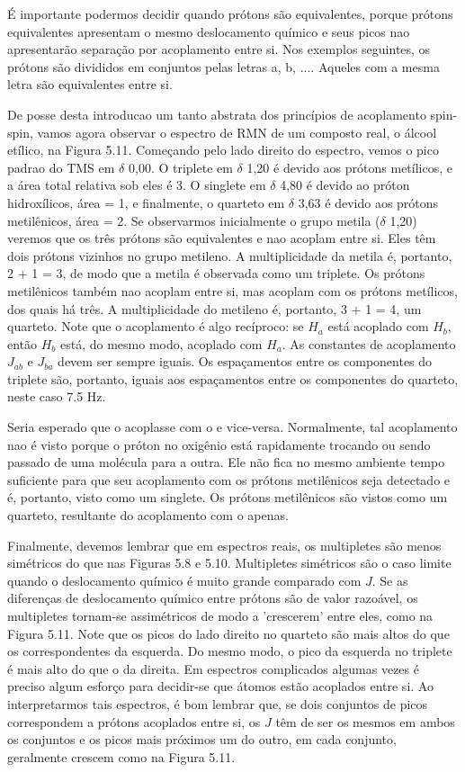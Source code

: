 É importante podermos decidir quando prótons são equivalentes, porque prótons equivalentes apresentam o mesmo deslocamento químico e seus picos nao apresentarão separação por acoplamento entre si. Nos exemplos seguintes, os prótons são divididos em conjuntos pelas letras a, b, .... Aqueles com a mesma letra são equivalentes entre si.

De posse desta introducao um tanto abstrata dos princípios de acoplamento spin-spin, vamos agora observar o espectro de RMN de um composto real, o álcool etílico, na Figura 5.11. Começando pelo lado direito do espectro, vemos o pico padrao do TMS em $\delta$ 0,00. O triplete em $\delta$ 1,20 é devido aos prótons metílicos, e a área total relativa sob eles é 3. O singlete em $\delta$ 4,80 é devido ao próton hidroxílicos, área = 1, e finalmente, o quarteto em $\delta$ 3,63 é devido aos prótons metilênicos, área = 2. Se observarmos inicialmente o grupo metila ($\delta$ 1,20) veremos que os três prótons são equivalentes e nao acoplam entre si. Eles têm dois prótons vizinhos no grupo metileno. A multiplicidade da metila é, portanto, 2 + 1 = 3, de modo que a metila é observada como um triplete. Os prótons metilênicos também nao acoplam entre si, mas acoplam com os prótons metílicos, dos quais há três. A multiplicidade do metileno é, portanto, 3 + 1 = 4, um quarteto. Note que o acoplamento é algo recíproco: se $H_a$ está acoplado com $H_b$, então $H_b$ está, do mesmo modo, acoplado com $H_a$. As constantes de acoplamento $J_{ab}$ e $J_{ba}$ devem ser sempre iguais. Os espaçamentos entre os componentes do triplete são, portanto, iguais aos espaçamentos entre os componentes do quarteto, neste caso 7.5 Hz.

Seria esperado que o  acoplasse com o  e vice-versa. Normalmente, tal acoplamento nao é visto porque o próton no oxigênio está rapidamente trocando ou sendo passado de uma molécula para a outra. Ele não fica no mesmo ambiente tempo suficiente para que seu acoplamento com os prótons metilênicos seja detectado e é, portanto, visto como um singlete. Os prótons metilênicos são vistos como um quarteto, resultante do acoplamento com o  apenas.

Finalmente, devemos lembrar que em espectros reais, os multipletes são menos simétricos do que nas Figuras 5.8 e 5.10. Multipletes simétricos são o caso limite quando o deslocamento químico é muito grande comparado com $J$. Se as diferenças de deslocamento químico entre prótons são de valor razoável, os multipletes tornam-se assimétricos de modo a 'crescerem' entre eles, como na Figura 5.11. Note que os picos do lado direito no quarteto são mais altos do que os correspondentes da esquerda. Do mesmo modo, o pico da esquerda no triplete é mais alto do que o da direita. Em espectros complicados algumas vezes é preciso algum esforço para decidir-se que átomos estão acoplados entre si. Ao interpretarmos tais espectros, é bom lembrar que, se dois conjuntos de picos correspondem a prótons acoplados entre si, os $J$ têm de ser os mesmos em ambos os conjuntos e os picos mais próximos um do outro, em cada conjunto, geralmente crescem como na Figura 5.11.

